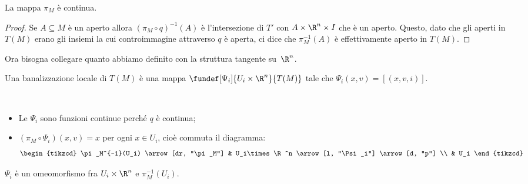 \begin{prop}
	La mappa $\pi_M$ è continua.
\end{prop}

\begin{proof}
	Se $A\subseteq M$ è un aperto allora
	$(\pi_M\circ q)^{-1}(A)$ è l'intersezione di $T'$ con $A\times \R^n \times I$ che è un aperto.
	Questo, dato che gli aperti in $T(M)$ erano gli insiemi
	la cui controimmagine attraverso $q$ è aperta,
	ci dice che $\pi_M^{-1}(A)$ è effettivamente aperto in $T(M)$.
\end{proof}

Ora bisogna collegare quanto abbiamo definito con la struttura tangente su~$\R^n$.

\begin{defn}
	Una banalizzazione locale di $T(M)$ è una mappa
	$\fundef[\Psi_i]{U_i\times\R^n}{T(M)}$
	tale che $\Psi_i(x, v)=[(x, v, i)]$.
\end{defn}

\begin{oss}~
	\begin{itemize}
		\item Le $\Psi_i$ sono funzioni continue perché $q$ è continua;
		\item $(\pi_M \circ \Psi_i)(x, v)=x$ per ogni $x\in U_i$, cioè commuta il diagramma:
			\begin{equation*}
				\begin{tikzcd}
					\pi_M^{-1}(U_i) \arrow[dr, "\pi_M"]
					& U_i\times\R^n \arrow[l, "\Psi_i"] \arrow[d, "p"] \\
					& U_i
				\end{tikzcd}
			\end{equation*}
	\end{itemize}
\end{oss}

\begin{prop}
	$\Psi_i$ è un omeomorfismo fra $U_i \times \R^n$ e $\pi_M^{-1}(U_i)$.
\end{prop}

